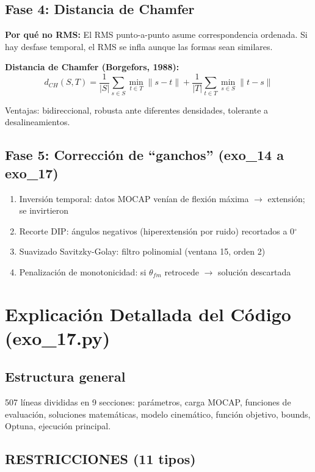 \documentclass[11pt,letterpaper]{article}
\begin{document}
\subsection{Fase 4: Distancia de Chamfer}

\textbf{Por qu\'e no RMS:} El RMS punto-a-punto asume correspondencia ordenada. Si hay desfase temporal, el RMS se infla aunque las formas sean similares.

\textbf{Distancia de Chamfer (Borgefors, 1988):}
$$d_{CH}(S,T) = \frac{1}{|S|}\sum_{s \in S} \min_{t \in T} \|s - t\| + \frac{1}{|T|}\sum_{t \in T} \min_{s \in S} \|t - s\|$$

Ventajas: bidireccional, robusta ante diferentes densidades, tolerante a desalineamientos.

\subsection{Fase 5: Correcci\'on de ``ganchos'' (exo\_14 a exo\_17)}
\begin{enumerate}
\item Inversi\'on temporal: datos MOCAP ven\'ian de flexi\'on m\'axima $\rightarrow$ extensi\'on; se invirtieron
\item Recorte DIP: \'angulos negativos (hiperextensi\'on por ruido) recortados a 0$^\circ$
\item Suavizado Savitzky-Golay: filtro polinomial (ventana 15, orden 2)
\item Penalizaci\'on de monotonicidad: si $\theta_{fm}$ retrocede $\rightarrow$ soluci\'on descartada
\end{enumerate}

\section{Explicaci\'on Detallada del C\'odigo (exo\_17.py)}

\subsection{Estructura general}
507 l\'ineas divididas en 9 secciones: par\'ametros, carga MOCAP, funciones de evaluaci\'on, soluciones matem\'aticas, modelo cinem\'atico, funci\'on objetivo, bounds, Optuna, ejecuci\'on principal.

\subsection{RESTRICCIONES (11 tipos)}
\end{document}
